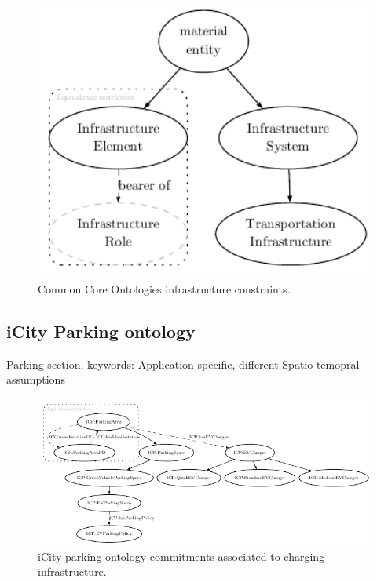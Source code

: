 \begin{figure}[h]
    \caption{Common Core Ontologies infrastructure constraints.}
    \centering
    \includegraphics[width=1.0\textwidth]{images/infrastructureSystem}
\end{figure}



\subsection{iCity Parking ontology}

Parking section, keywords: Application specific, different Spatio-temopral assumptions

\begin{figure}[h]
    \caption{iCity parking ontology commitments associated to charging infrastructure.}
    \centering
    \includegraphics[width=1.0\textwidth]{images/PARKING}
\end{figure}
